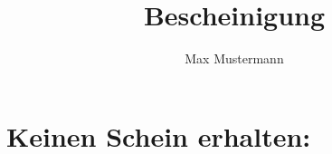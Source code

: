 \documentclass[%
  a4paper,%
  10pt,%
  blue,%
  ]{tubsartcl}	%
\title{Bescheinigung}
\author{Max Mustermann}
\newcommand*{\KeinSchein}{}
\begin{document}
\maketitle%


\vspace*{10mm}
	\section*{Keinen Schein erhalten:}
		{%
		\def\do#1#2#3#4{\makebox[\linewidth][l]{#1 #2, #3, #4}\\}
		\KeinSchein
		}
\end{document}
